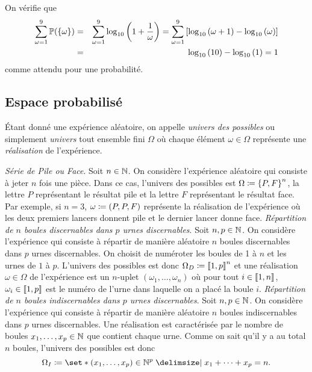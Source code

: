 \documentclass{magnolia}
\begin{document}
\begin{center}

\end{center}
\noindent
On vérifie que
\begin{eqnarray*}
\sum_{\omega=1}^9 \mathbb{P}(\left\{\omega\right\})
&=& \sum_{\omega=1}^9 \log_{10}\left(1+\frac{1}{\omega}\right)
= \sum_{\omega=1}^9 \left[\log_{10}\left(\omega+1\right)-\log_{10}\left(\omega\right)\right]\\
&=& \log_{10}\left(10\right)-\log_{10}\left(1\right) = 1
\end{eqnarray*}
comme attendu pour une probabilité.

\subsection{Espace probabilisé}

\begin{definition}
Étant donné une expérience aléatoire, on appelle \emph{univers des possibles} ou simplement
\emph{univers} tout ensemble fini $\Omega$ où chaque élément $\omega\in\Omega$ représente une
\emph{réalisation} de l'expérience.
\end{definition}

\begin{exemples}
\exemple \emph{Série de Pile ou Face}. Soit $n\in\mathbb{N}$. On considère l'expérience aléatoire
  qui consiste à jeter $n$ fois une pièce. Dans ce cas, l'univers des possibles est
  $\Omega\coloneqq\left\{P,F\right\}^n$, la lettre $P$ représentant le résultat pile et la lettre
  $F$ représentant le résultat face. Par exemple, si $n=3$,
  $\omega\coloneqq(P,P,F)$ représente la réalisation de l'expérience où les deux premiers
   lancers donnent pile et le dernier lancer donne face.
\exemple \emph{Répartition de $n$ boules discernables dans $p$ urnes discernables}. Soit
  $n,p\in\mathbb{N}$. On considère l'expérience qui consiste à répartir de manière aléatoire $n$
  boules discernables dans $p$ urnes discernables. On choisit de numéroter les boules de
  1 à $n$ et les urnes de $1$ à $p$. L'univers des possibles est donc
  $\Omega_D\coloneqq\left\llbracket 1,p\right\rrbracket^n$ et une réalisation $\omega\in\Omega$ de l'expérience
   est un $n$-uplet $(\omega_1,\ldots,\omega_n)$ où pour tout $i\in\left\llbracket 1,n\right\rrbracket$,
  $\omega_i\in\left\llbracket 1,p\right\rrbracket$ est le numéro de l'urne dans laquelle on a placé la boule $i$.
\exemple
  \emph{Répartition de $n$ boules indiscernables dans $p$ urnes discernables}. Soit
  $n,p\in\mathbb{N}$. On considère l'expérience qui consiste à répartir de manière aléatoire
  $n$ boules indiscernables dans $p$ urnes discernables. Une réalisation est
  caractérisée par le nombre de boules $x_1,\ldots,x_p\in\mathbb{N}$ que contient chaque urne.
  Comme on sait qu'il y a au total $n$ boules, l'univers des possibles est donc
  \[\Omega_I\defeq\enstq{(x_1,\ldots,x_p)\in\N^p}{x_1+\cdots+x_p=n}.\]
\end{exemples}
\end{document}
